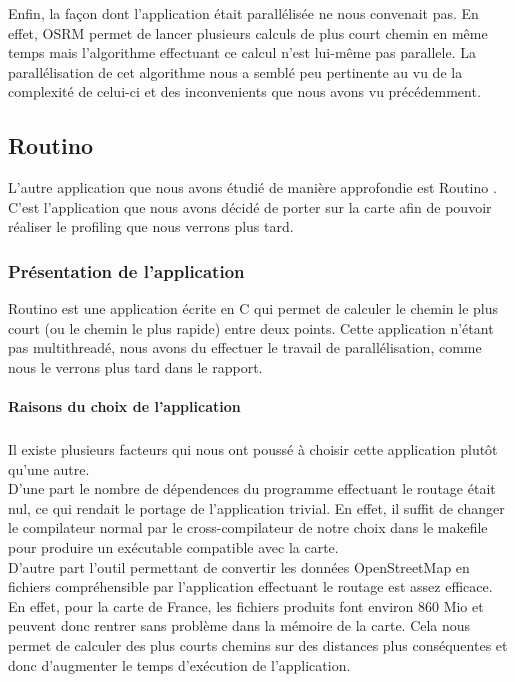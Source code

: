 Enfin, la façon dont l'application était parallélisée ne nous convenait pas. En 
effet, OSRM permet de lancer plusieurs calculs de plus court chemin en même 
temps mais l'algorithme effectuant ce calcul n'est lui-même pas parallele. 
La parallélisation de cet algorithme nous a semblé peu pertinente au vu de la 
complexité de celui-ci et des inconvenients que nous avons vu précédemment.

\subsection{Routino}

L'autre application que nous avons étudié de manière approfondie est Routino 
\nocite{bishop_routino_????}. C'est l'application que nous avons décidé de
porter sur la carte afin de pouvoir réaliser le profiling que nous verrons plus
tard.

\subsubsection{Présentation de l'application}

Routino est une application écrite en C qui permet de calculer le chemin le 
plus court (ou le chemin le plus rapide) entre deux points. Cette application 
n'étant pas multithreadé, nous avons du effectuer le travail de parallélisation,
comme nous le verrons plus tard dans le rapport.

\paragraph{Raisons du choix de l'application}
\subparagraph{}

Il existe plusieurs facteurs qui nous ont poussé à choisir cette application 
plutôt qu'une autre. \\

D'une part le nombre de dépendences du programme effectuant le routage 
était nul, ce qui rendait le portage de l'application trivial. En effet, il 
suffit de changer le compilateur normal par le cross-compilateur de notre choix 
dans le makefile pour produire un exécutable compatible avec la carte. \\

D'autre part l'outil permettant de convertir les données OpenStreetMap en 
fichiers compréhensible par l'application effectuant le routage est assez 
efficace. En effet, pour la carte de France, les fichiers produits font environ 
860 Mio et peuvent donc rentrer sans problème dans la mémoire de la carte. Cela 
nous permet de calculer des plus courts chemins sur des distances plus 
conséquentes et donc d'augmenter le temps d'exécution de l'application. \\


